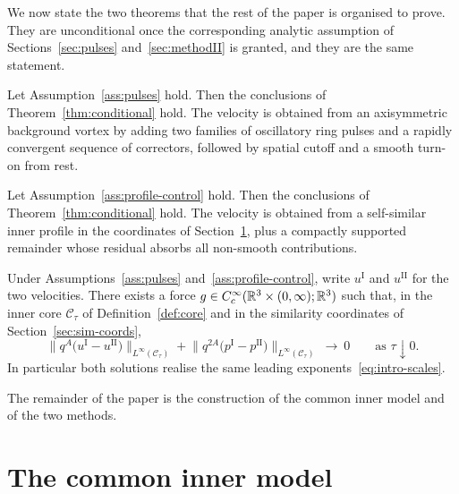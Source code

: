 We now state the two theorems that the rest of the paper is organised to prove. They are unconditional once the corresponding analytic assumption of Sections~\ref{sec:pulses} and~\ref{sec:methodII} is granted, and they are the same statement.

\begin{theorem}[Method~I]
\label{thm:methodI}
Let Assumption~\ref{ass:pulses} hold. Then the conclusions of Theorem~\ref{thm:conditional} hold. The velocity is obtained from an axisymmetric background vortex by adding two families of oscillatory ring pulses and a rapidly convergent sequence of correctors, followed by spatial cutoff and a smooth turn-on from rest.
\end{theorem}

\begin{theorem}[Method~II]
\label{thm:methodII}
Let Assumption~\ref{ass:profile-control} hold. Then the conclusions of Theorem~\ref{thm:conditional} hold. The velocity is obtained from a self-similar inner profile in the coordinates of Section~\ref{sec:model}, plus a compactly supported remainder whose residual absorbs all non-smooth contributions.
\end{theorem}

\begin{theorem}[Comparison]
\label{thm:comparison}
Under Assumptions~\ref{ass:pulses} and~\ref{ass:profile-control}, write $u^{\mathrm I}$ and $u^{\mathrm{II}}$ for the two velocities. There exists a force $g\in C_c^\infty(\mathbb{R}^3\times(0,\infty);\mathbb{R}^3)$ such that, in the inner core $\mathcal C_\tau$ of Definition~\ref{def:core} and in the similarity coordinates of Section~\ref{sec:sim-coords},
\begin{equation}
\label{eq:comparison}
\bigl\|q^{A}\bigl(u^{\mathrm I}-u^{\mathrm{II}}\bigr)\bigr\|_{L^\infty(\mathcal C_\tau)}
+\bigl\|q^{2A}\bigl(p^{\mathrm I}-p^{\mathrm{II}}\bigr)\bigr\|_{L^\infty(\mathcal C_\tau)}
\ \longrightarrow\ 0
\qquad\text{as }\tau\downarrow 0.
\end{equation}
In particular both solutions realise the same leading exponents~\eqref{eq:intro-scales}.
\end{theorem}

The remainder of the paper is the construction of the common inner model and of the two methods.

\section{The common inner model}
\label{sec:model}

